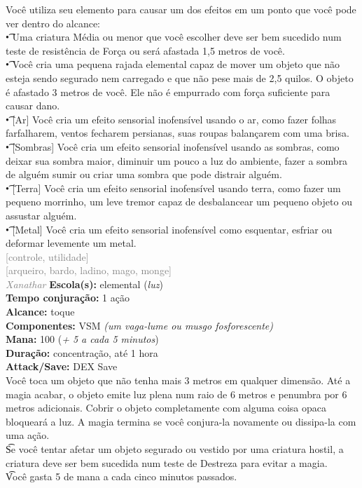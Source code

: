 \documentclass{RPG_Adventure}[2021/10/20]
\begin{document}
{\normalsize Você utiliza seu elemento para causar um dos efeitos em um ponto que você pode ver dentro do alcance:\\\t • Uma criatura Média ou menor que você escolher deve ser bem sucedido num teste de resistência de Força ou será afastada 1,5 metros de você.\\\t • Você cria uma pequena rajada elemental capaz de mover um objeto que não esteja sendo segurado nem carregado e que não pese mais de 2,5 quilos. O objeto é afastado 3 metros de você. Ele não é empurrado com força suficiente para causar dano.\\\t • [Ar] Você cria um efeito sensorial inofensível usando o ar, como fazer folhas farfalharem, ventos fecharem persianas, suas roupas balançarem com uma brisa.\\\t • [Sombras] Você cria um efeito sensorial inofensível usando as sombras, como deixar sua sombra maior, diminuir um pouco a luz do ambiente, fazer a sombra de alguém sumir ou criar uma sombra que pode distrair alguém.\\\t • [Terra] Você cria um efeito sensorial inofensível usando terra, como fazer um pequeno morrinho, um leve tremor capaz de desbalancear um pequeno objeto ou assustar alguém.\\\t • [Metal] Você cria um efeito sensorial inofensível como esquentar, esfriar ou deformar levemente um metal.\\}
{\scriptsize \textcolor{gray}{[controle, utilidade]\\}}
{\scriptsize \textcolor{gray}{[arqueiro, bardo, ladino, mago, monge]\\}}
{\tiny \textcolor{gray}{\textit{Xanathar}}}\jump{}
{\small \t \textbf{Escola(s):} elemental (\textit{luz})\\\t \textbf{Tempo conjuração:} 1 ação\\\t \textbf{Alcance:} toque\\\t \textbf{Componentes:} VSM \textit{(um vaga-lume ou musgo fosforescente)}\\\t \textbf{Mana:} 100 (\textit{+ 5 a cada 5 minutos})\\\t \textbf{Duração:} concentração, até 1 hora\\\t \textbf{Attack/Save:} DEX Save\\}
{\normalsize Você toca um objeto que não tenha mais 3 metros em qualquer dimensão. Até a magia acabar, o objeto emite luz plena num raio de 6 metros e penumbra por 6 metros adicionais. Cobrir o objeto completamente com alguma coisa opaca bloqueará a luz. A magia termina se você conjura-la novamente ou dissipa-la com uma ação.\\\t Se você tentar afetar um objeto segurado ou vestido por uma criatura hostil, a criatura deve ser bem sucedida num teste de Destreza para evitar a magia.\\\t Você gasta 5 de mana a cada cinco minutos passados.\\}
\end{document}
